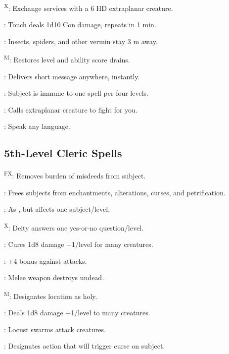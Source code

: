 \textsuperscript{X}: Exchange services with a 6 HD extraplanar creature.

: Touch deals 1d10 Con damage, repeats in 1 min.

: Insects, spiders, and other vermin stay 3 m away.

\textsuperscript{M}: Restores level and ability score drains.

: Delivers short message anywhere, instantly.

: Subject is immune to one spell per four levels.

: Calls extraplanar creature to fight for you.

: Speak any language.



\subsection{5th-Level Cleric Spells}

\textsuperscript{FX}: Removes burden of misdeeds from subject.

: Frees subjects from enchantments, alterations, curses, and petrification.

: As , but affects one subject/level.

\textsuperscript{X}: Deity answers one yes-or-no question/level.

: Cures 1d8 damage +1/level for many creatures.

: +4 bonus against attacks.

: Melee weapon destroys undead.


\textsuperscript{M}: Designates location as holy.

: Deals 1d8 damage +1/level to many creatures.

: Locust swarms attack creatures.

: Designates action that will trigger curse on subject.

